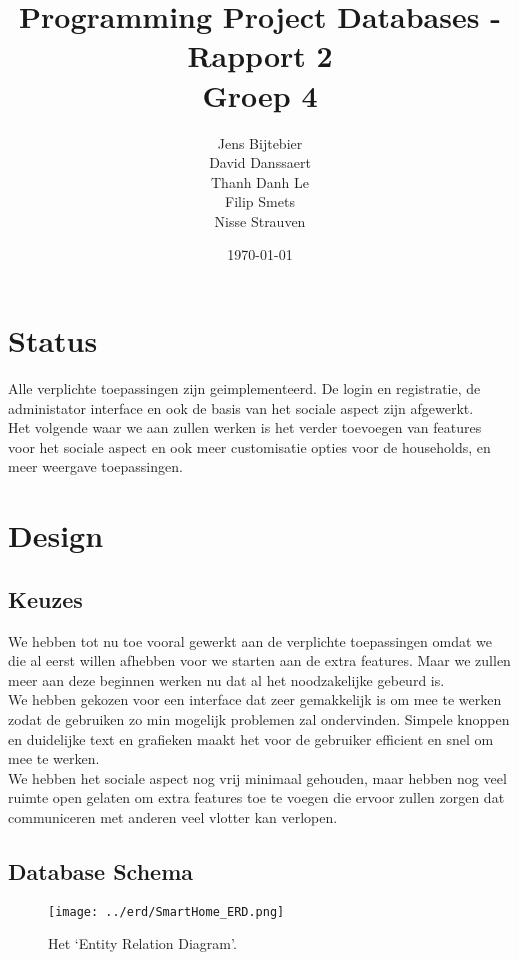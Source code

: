 \documentclass[11pt]{article}
\title{\textbf{Programming Project Databases - Rapport 2}\\
		Groep 4}
\author{Jens Bijtebier\\
		David Danssaert\\
		Thanh Danh Le\\
		Filip Smets\\
		Nisse Strauven}
\date{\today}
\begin{document}
\maketitle


\section{Status}
Alle verplichte toepassingen zijn geimplementeerd. De login en registratie, de administator
interface en ook de basis van het sociale aspect zijn afgewerkt.\\

Het volgende waar we aan zullen werken is het verder toevoegen van features voor het sociale
aspect en ook meer customisatie opties voor de households, en meer weergave toepassingen.

\section{Design}
  \subsection{Keuzes}
	We hebben tot nu toe vooral gewerkt aan de verplichte toepassingen omdat we die al eerst willen
	afhebben voor we starten aan de extra features. Maar we zullen meer aan deze beginnen
	werken nu dat al het noodzakelijke gebeurd is.\\

	We hebben gekozen voor een interface dat zeer gemakkelijk is om mee te werken zodat de
	gebruiken zo min mogelijk problemen zal ondervinden. Simpele knoppen en duidelijke text en
	grafieken maakt het voor de gebruiker efficient en snel om mee te werken.\\
	
	We hebben het sociale aspect nog vrij minimaal gehouden, maar hebben nog veel ruimte open
	gelaten om extra features toe te voegen die ervoor zullen zorgen dat communiceren met anderen
	veel vlotter kan verlopen.

  \subsection{Database Schema}
  \begin{figure}[H]
  \centering
    \texttt{[image: ../erd/SmartHome\_ERD.png]}
  \caption{Het `Entity Relation Diagram'.}
  \label{fig:erd}
  \end{figure}
  
\end{document}
